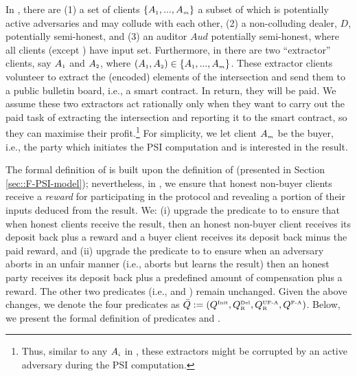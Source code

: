 In \ep, there are (1) a set of clients $\{A_{\scriptscriptstyle 1},...,A_{\scriptscriptstyle m}\}$ a subset of which is potentially active adversaries and may collude with each other, (2) a non-colluding dealer, $D$, potentially semi-honest, and (3) an auditor $Aud$ potentially semi-honest, where all clients (except \aud) have input set. Furthermore,  in \ep  there are two ``extractor'' clients, say $A_{\scriptscriptstyle 1}$ and $A_{\scriptscriptstyle 2}$, where $(A_{\scriptscriptstyle 1},A_{\scriptscriptstyle 2})\in \{A_{\scriptscriptstyle 1},...,A_{\scriptscriptstyle m}\}$. These extractor clients volunteer to extract the (encoded) elements of the intersection and send them to a public bulletin board, i.e., a smart contract. In return, they will be paid. 
%
%
We assume these two extractors act rationally only when they want to carry out the paid task of extracting the intersection and reporting it to the smart contract, so they can maximise their profit.\footnote{Thus, similar to any $A_{\scriptscriptstyle i}$ in \p, these extractors might be corrupted by an active adversary during the PSI computation.} For simplicity, we let client $A_{\scriptscriptstyle m}$ be the buyer, i.e., the party which initiates the PSI computation and is interested in the result. 


 The formal definition of \ep is built upon the definition of \p (presented in Section \ref{sec::F-PSI-model}); nevertheless, in \ep, we ensure that honest non-buyer clients receive a \emph{reward} for participating in the protocol and revealing a portion of their inputs deduced from the result. We:  (i)  upgrade the predicate \qdel to  \qdelwr to ensure that when honest clients receive the result, then an honest non-buyer client receives its deposit back plus a reward and a buyer client receives its deposit back minus the paid reward, and (ii) upgrade the predicate  \qUnFAbt to \qUnFAbtwr to ensure when an adversary aborts in an unfair manner (i.e., aborts but learns the result) then an honest party receives its deposit back plus a predefined amount of compensation plus a reward.  The other two predicates (i.e., \qinit and \qFAbt) remain unchanged. Given the above changes, we denote the four predicates as $\bar Q:=(Q^{\scriptscriptstyle \text{Init}},  Q^{\scriptscriptstyle \text{Del}}_{\scriptscriptstyle\text{R}}, Q^{\scriptscriptstyle \text{UF-A}}_{\scriptscriptstyle \text{R}}, Q^{\scriptscriptstyle \text{F-A}})$. Below, we present the formal definition of predicates \qdelwr and \qUnFAbtwr. 
 
 
\vs

